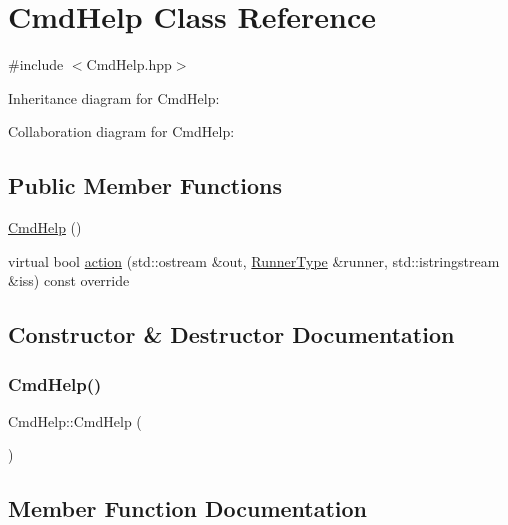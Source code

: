 \hypertarget{classCmdHelp}{}\section{Cmd\+Help Class Reference}
\label{classCmdHelp}


{\ttfamily \#include $<$Cmd\+Help.\+hpp$>$}



Inheritance diagram for Cmd\+Help\+:


Collaboration diagram for Cmd\+Help\+:
\subsection*{Public Member Functions}
\begin{DoxyCompactItemize}
\item 
\hyperlink{classCmdHelp_a2c31488db208acdb2b30cc7bb561a69c}{Cmd\+Help} ()
\item 
virtual bool \hyperlink{classCmdHelp_adae5afd78e75a73735d0ced85b5604a5}{action} (std\+::ostream \&out, \hyperlink{Command_8hpp_ad45c3de597c2023a8be0399d914161f4}{Runner\+Type} \&runner, std\+::istringstream \&iss) const override
\end{DoxyCompactItemize}


\subsection{Constructor \& Destructor Documentation}
\mbox{\label{classCmdHelp_a2c31488db208acdb2b30cc7bb561a69c}} 
\subsubsection{\texorpdfstring{Cmd\+Help()}{CmdHelp()}}
{\footnotesize\ttfamily Cmd\+Help\+::\+Cmd\+Help (\begin{DoxyParamCaption}{ }\end{DoxyParamCaption})}



\subsection{Member Function Documentation}
\mbox{\label{classCmdHelp_adae5afd78e75a73735d0ced85b5604a5}} 
